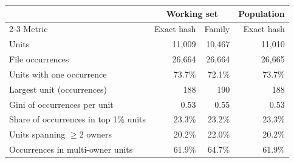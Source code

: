 \begin{tabular}{lrrr}
\toprule
 & \multicolumn{2}{c}{Working set} & Population \\
\cmidrule(lr){2-3}
Metric & Exact hash & Family & Exact hash \\
\midrule
Units & 11,009 & 10,467 & 11,010 \\
File occurrences & 26,664 & 26,664 & 26,665 \\
Units with one occurrence & 73.7\% & 72.1\% & 73.7\% \\
Largest unit (occurrences) & 188 & 190 & 188 \\
Gini of occurrences per unit & 0.53 & 0.55 & 0.53 \\
Share of occurrences in top 1\% units & 23.3\% & 23.2\% & 23.3\% \\
Units spanning $\geq$2 owners & 20.2\% & 22.0\% & 20.2\% \\
Occurrences in multi-owner units & 61.9\% & 64.7\% & 61.9\% \\
\bottomrule
\end{tabular}
